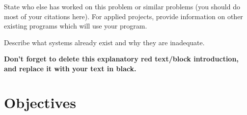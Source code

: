 \begin{tcolorbox}[      %
    boxrule=0pt,        %
    colback=white,      %
    coltext=red         %
]                       %
    State who else has worked on this problem or similar problems (you should do most of your citations here). For applied projects, provide information on other existing programs which will use your program.
    
    Describe what systems already exist and why they are inadequate. 
    
    \vspace{15pt}       %
    \begin{center}      %
    \textbf{Don't forget to delete this explanatory red text/block introduction, and replace it with your text in black.}
    \end{center}        %
\end{tcolorbox}         %

\section{Objectives} %

